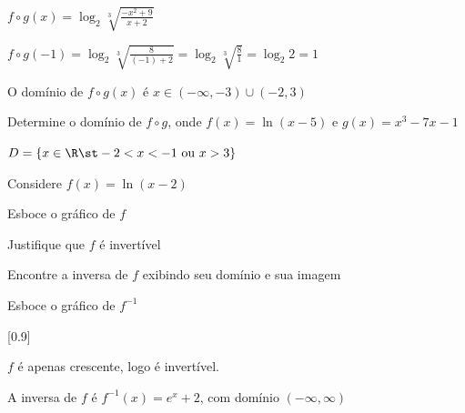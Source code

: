 \begin{exercises*}
\begin{exercise}
  \begin{answer}
    \begin{alphalist}
      \item \(f\circ g(x) = \log_2\sqrt[3]{\frac{-x^2+9}{x+2}}\)
      \item \(f\circ g(-1)
             = \log_2\sqrt[3]{\frac{8}{(-1)+2}}
             = \log_2\sqrt[3]{\frac{8}{1}}
             = \log_2 2
             = 1\)
      \item O domínio de $f\circ g(x)$ é $x\in (-\infty, -3) \cup (-2, 3)$
    \end{alphalist}
  \end{answer}
\end{exercise}

\begin{exercise}
  Determine o domínio de $f\circ g$, onde $f(x)=\ln(x-5)$ e $g(x)=x^3-7x-1$

  \begin{answer}
    \( D = \{ x \in \R \st -2 < x < -1 \text{ ou } x > 3 \} \)
  \end{answer}
\end{exercise}

\begin{exercise}
  Considere $f(x)=\ln(x-2)$
  \begin{alphalist}
    \item Esboce o gráfico de $f$
    \item Justifique que $f$ é invertível
    \item Encontre a inversa de $f$ exibindo seu domínio e sua imagem
    \item Esboce o gráfico de $f^{-1}$
  \end{alphalist}

  \begin{answer}
    \begin{alphalist}
      \item {}[0.9]
      \item $f$ é apenas crescente, logo é invertível.
      \item A inversa de $f$ é $f^{-1}(x) = e^x+2$,
            com domínio $(-\infty, \infty)$
      \item
    \end{alphalist}
  \end{answer}
\end{exercise}


\end{exercises*}
